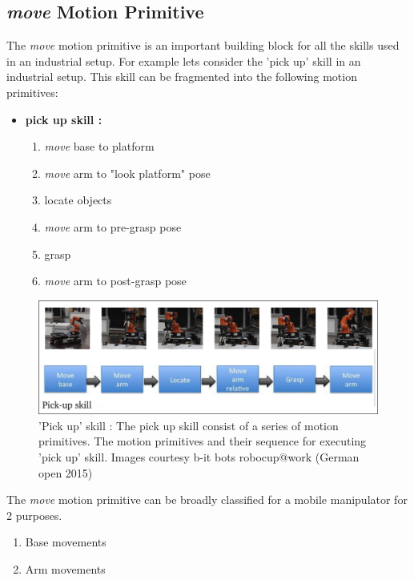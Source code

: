 \FloatBarrier
\subsection{\textit{move} Motion Primitive}
The \textit{move} motion primitive is an important building block for all the
skills used in an industrial setup.  For example lets consider the
'pick up' skill in an industrial setup. This skill can be fragmented into the following motion
primitives:
\begin{itemize}
    \item \textbf{pick up skill :}
\begin{enumerate}
    \setlength\itemsep{0.1em}
    \item \textit{move} base to platform
    \item \textit{move} arm to "look platform" pose
    \item locate objects
    \item \textit{move} arm to pre-grasp pose
    \item grasp
    \item \textit{move} arm to post-grasp pose
\end{enumerate}
\end{itemize}
\begin{figure}[htp]
\centering
\includegraphics[scale=0.8]{images/pickupskill/pickupskill.png}
\caption['Pick up' skill]{'Pick up' skill : The pick up skill consist of a series of motion primitives. 
The motion primitives and their sequence for executing 'pick up' skill. Images courtesy b-it bots robocup@work (German open 2015)}
\label{pick up}
\end{figure}

The \textit{move} motion primitive can be broadly classified for a mobile manipulator for 2 purposes.
\begin{enumerate}
    \setlength\itemsep{0.1em}
    \item Base movements
    \item Arm movements
\end{enumerate}

